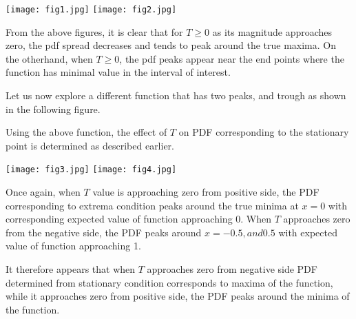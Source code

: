 \documentclass{article}
\begin{document}
\begin{tcolorbox}[fonttitle=\sffamily\bfseries\large,
  title={$sin(x)$} ]
    \centering
     
\end{tcolorbox}

\begin{tcolorbox}[fonttitle=\sffamily\bfseries\large,
  title=Change in pdf with T when $T \le 0$ and $T \ge 0$ ]
     \texttt{[image: fig1.jpg]}
     \hspace{1cm}
     \texttt{[image: fig2.jpg]}
\end{tcolorbox}


From the above figures, it is clear that for $T \ge 0$ as its 
magnitude approaches zero, the pdf spread decreases and
tends to peak around the true maxima. On the otherhand,
when $T \ge 0$, the pdf peaks appear near the end points where
the function has minimal value in the interval of interest. 

Let us now explore a different function that has two peaks, and trough as shown in the
following figure. 
\begin{tcolorbox}[fonttitle=\sffamily\bfseries\large,
    title={$y(x)=8(1-2x^2)x^2  -0.6<x<0.6  $} ]
    \centering
     
\end{tcolorbox}

Using the above function, the effect of $T$ on PDF corresponding to the stationary
point is determined as described earlier.

\begin{tcolorbox}[fonttitle=\sffamily\bfseries\large,
    title=Effect of $T$ on PDF at stationary condition]
     \texttt{[image: fig3.jpg]}
     \hspace{1cm}
     \texttt{[image: fig4.jpg]}
\end{tcolorbox}

Once again, when $T$ value is approaching zero from positive side,
the PDF corresponding to extrema condition peaks around the true minima
at $x=0$ with corresponding expected value of function approaching 0.
When $T$ approaches zero from the negative side, the PDF peaks around
$x=-0.5, and 0.5$ with expected value of function approaching 1.

It therefore appears that when $T$ approaches zero from negative side
PDF determined from stationary condition corresponds to maxima of the function,
while it approaches zero from positive side, the PDF peaks around the minima of the 
function.
\end{document}
